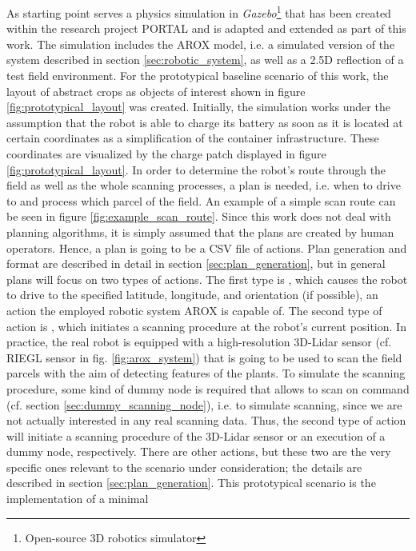\documentclass[english, master, utf8]{base/thesis_KBS}
\newcommand{\code}{\collectverb{\codebox}}
\begin{document}
As starting point serves a physics simulation in \textit{Gazebo}\footnote{Open-source 3D robotics simulator} that has been created within the research project PORTAL \cite{portal}
and is adapted and extended as part of this work. The simulation includes the AROX model, i.e. a simulated version of the system described in section \ref{sec:robotic_system},
as well as a 2.5D reflection of a test field environment. For the prototypical baseline scenario of this work, the layout of abstract crops as objects of interest shown in 
figure \ref{fig:prototypical_layout} was created. Initially, the simulation works under the assumption that the robot is able to charge its battery as soon as it is located at 
certain coordinates as a simplification of the container infrastructure. These coordinates are visualized by the charge patch displayed in figure \ref{fig:prototypical_layout}.
In order to determine the robot's route through the field as well as the whole scanning processes, a plan is needed, i.e. when to drive to and process which parcel of the field. 
An example of a simple scan route can be seen in figure \ref{fig:example_scan_route}. Since this work does not deal with planning algorithms, it is simply assumed that the plans
are created by human operators. Hence, a plan is going to be a CSV file of actions. Plan generation and format are described in detail in section \ref{sec:plan_generation}, 
but in general plans will focus on two types of actions. The first type is \code{drive_to(lat, lng, theta)}, which causes the robot to drive to the specified latitude, 
longitude, and orientation (if possible), an action the employed robotic system AROX is capable of. The second type of action is \code{scan}, which initiates a scanning procedure
at the robot's current position. In practice, the real robot is equipped with a high-resolution 3D-Lidar sensor (cf. RIEGL sensor in fig. \ref{fig:arox_system}) that is going 
to be used to scan the field parcels with the aim of detecting features of the plants. To simulate the scanning procedure, some kind of dummy node is required that allows to 
scan on command (cf. section \ref{sec:dummy_scanning_node}), i.e. to simulate scanning, since we are not actually interested in any real scanning data. Thus, the second type 
of action will initiate a scanning procedure of the 3D-Lidar sensor or an execution of a dummy node, respectively. There are other actions, but these two are the very specific ones
relevant to the scenario under consideration; the details are described in section \ref{sec:plan_generation}. This prototypical scenario is the implementation of a minimal 
\end{document}

